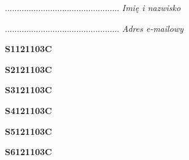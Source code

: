\begin{turn}{90}\begin{minipage}{\linewidth} \vspace{20mm} ................................................  \textit{Imię i nazwisko}\end{minipage}\end{turn}

\begin{turn}{90}\begin{minipage}{\linewidth} \vspace{20mm} ................................................  \textit{Adres e-mailowy}\end{minipage}\end{turn}

\begin{turn}{90}\huge \begin{minipage}{\linewidth} \vspace{10mm}\textbf{S1121103C}\end{minipage}\end{turn}

\begin{turn}{90}\huge \begin{minipage}{\linewidth} \vspace{10mm}\textbf{S2121103C}\end{minipage}\end{turn}

\begin{turn}{90}\huge \begin{minipage}{\linewidth} \vspace{10mm}\textbf{S3121103C}\end{minipage}\end{turn}

\begin{turn}{90}\huge \begin{minipage}{\linewidth} \vspace{10mm}\textbf{S4121103C}\end{minipage}\end{turn}

\begin{turn}{90}\huge \begin{minipage}{\linewidth} \vspace{10mm}\textbf{S5121103C}\end{minipage}\end{turn}

\begin{turn}{90}\huge \begin{minipage}{\linewidth} \vspace{10mm}\textbf{S6121103C}\end{minipage}\end{turn}

